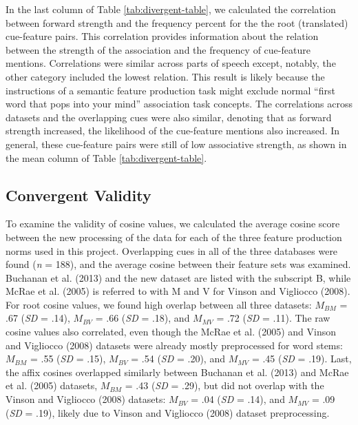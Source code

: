 \documentclass[english,,man]{apa6}
\begin{document}
In the last column of Table \ref{tab:divergent-table}, we calculated the correlation between forward strength and the frequency percent for the the root (translated) cue-feature pairs. This correlation provides information about the relation between the strength of the association and the frequency of cue-feature mentions. Correlations were similar across parts of speech except, notably, the other category included the lowest relation. This result is likely because the instructions of a semantic feature production task might exclude normal \enquote{first word that pops into your mind} association task concepts. The correlations across datasets and the overlapping cues were also similar, denoting that as forward strength increased, the likelihood of the cue-feature mentions also increased. In general, these cue-feature pairs were still of low associative strength, as shown in the mean column of Table \ref{tab:divergent-table}.

\hypertarget{convergent-validity}{%
\subsection{Convergent Validity}\label{convergent-validity}}

To examine the validity of cosine values, we calculated the average cosine score between the new processing of the data for each of the three feature production norms used in this project. Overlapping cues in all of the three databases were found (\emph{n} = 188), and the average cosine between their feature sets was examined. Buchanan et al. (2013) and the new dataset are listed with the subscript B, while McRae et al. (2005) is referred to with M and V for Vinson and Vigliocco (2008). For root cosine values, we found high overlap between all three datasets: \(M_{BM}\) = .67 (\emph{SD} = .14), \(M_{BV}\) = .66 (\emph{SD} = .18), and \(M_{MV}\) = .72 (\emph{SD} = .11). The raw cosine values also correlated, even though the McRae et al. (2005) and Vinson and Vigliocco (2008) datasets were already mostly preprocessed for word stems: \(M_{BM}\) = .55 (\emph{SD} = .15), \(M_{BV}\) = .54 (\emph{SD} = .20), and \(M_{MV}\) = .45 (\emph{SD} = .19). Last, the affix cosines overlapped similarly between Buchanan et al. (2013) and McRae et al. (2005) datasets, \(M_{BM}\) = .43 (\emph{SD} = .29), but did not overlap with the Vinson and Vigliocco (2008) datasets: \(M_{BV}\) = .04 (\emph{SD} = .14), and \(M_{MV}\) = .09 (\emph{SD} = .19), likely due to Vinson and Vigliocco (2008) dataset preprocessing.
\end{document}
